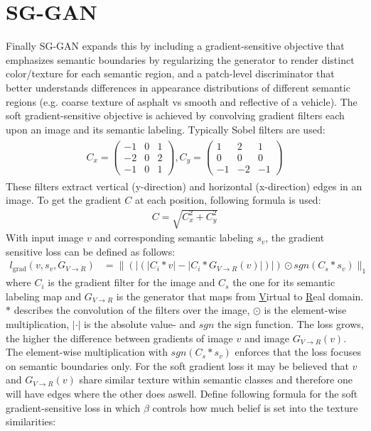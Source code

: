\section{SG-GAN}
Finally SG-GAN \cite{DBLP:journals/corr/abs-1801-01726} expands this by including a gradient-sensitive objective that emphasizes semantic boundaries by regularizing the generator to render distinct color/texture for each semantic region, and a patch-level discriminator that better understands differences in appearance distributions of different semantic regions (e.g. coarse texture of asphalt vs smooth and reflective of a vehicle). The soft gradient-sensitive objective is achieved by convolving gradient filters each upon an image and its semantic labeling. Typically Sobel filters are used:
\begin{align}
	\begin{array}{cc}
		C_x = 
		\begin{pmatrix}
			-1 & 0 & 1\\
			-2 & 0 & 2\\
			-1 & 0 & 1
		\end{pmatrix},
		C_y = 
		\begin{pmatrix}
			1 & 2 & 1\\
			0 & 0 & 0\\
			-1 & -2 & -1
		\end{pmatrix}
	\end{array}
\end{align}
These filters extract vertical (y-direction) and horizontal (x-direction) edges in an image. To get the gradient $C$ at each position, following formula is used:
\begin{align}
	C = \sqrt{C_x^2 + C_y^2}
\end{align}
With input image $v$ and corresponding semantic labeling $s_v$, the gradient sensitive loss can be defined as follows:
\begin{align}
		l_{\text{grad}}(v,s_v,G_{V\rightarrow R}) &= \lVert(|(|C_i * v |-|C_i*G_{V\rightarrow R}(v)|)|) \odot sgn(C_s*s_v)\rVert_1
\end{align}
where $C_i$ is the gradient filter for the image and $C_s$ the one for its semantic labeling map and $G_{V\rightarrow R}$ is the generator that maps from \underline{V}irtual to \underline{R}eal domain. $*$ describes the convolution of the filters over the image, $\odot$ is the element-wise multiplication, $|\cdot|$ is the absolute value- and $sgn$ the sign function. The loss grows, the higher the difference between gradients of image $v$ and image $G_{V\rightarrow R}(v)$. The element-wise multiplication with $sgn(C_s * s_v)$ enforces that the loss focuses on semantic boundaries only. For the soft gradient loss it may be believed that $v$ and $G_{V\rightarrow R}(v)$ share similar texture within semantic classes and therefore one will have edges where the other does aswell. Define following formula for the soft gradient-sensitive loss in which $\beta$ controls how much belief is set into the texture similarities:
